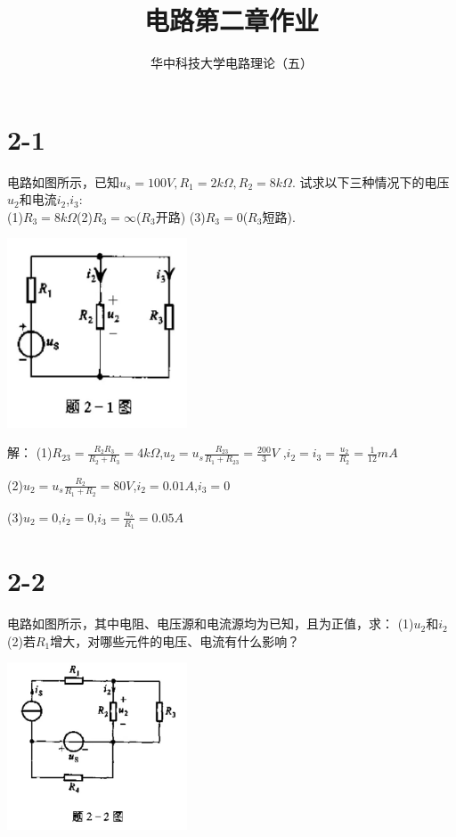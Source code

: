 \documentclass{article}
\title{电路第二章作业}
\author{华中科技大学电路理论（五）}
\date{}
\begin{document}
\maketitle
\section*{2-1}电路如图所示，已知$u_s=100V,R_1=2k\Omega,R_2=8k\Omega$.
试求以下三种情况下的电压$u_2$和电流$i_2$,$i_3$:\\
(1)$R_3=8k\Omega$\quad(2)$R_3=\infty$($R_3$开路)
(3)$R_3=0$($R_3$短路).\\
\begin{center}
\includegraphics[width=0.4\textwidth,height=0.2\textheight]{2-1.jpg}
\end{center}

\noindent 解：
(1)$R_\text{23}=\frac{R_2R_3}{R_2+R_3}=4k\Omega$,$u_2=u_s\frac{R_\text{23}}{R_1+R_\text{23}}=\frac{200}{3}V$
,$i_2=i_3=\frac{u_2}{R_2}=\frac{1}{12}mA$

(2)$u_2=u_s\frac{R_2}{R_1+R_2}=80V$,$i_2=0.01A$,$i_3=0$

(3)$u_2=0$,$i_2=0$,$i_3=\frac{u_s}{R_1}=0.05A$
\section*{2-2}电路如图所示，其中电阻、电压源和电流源均为已知，且为正值，求：
(1)$u_2$和$i_2$\quad (2)若$R_1$增大，对哪些元件的电压、电流有什么影响？\\
\begin{center}
\includegraphics[width=0.4\textwidth,height=0.2\textheight]{2-2.jpg}
\end{center}
\end{document}
